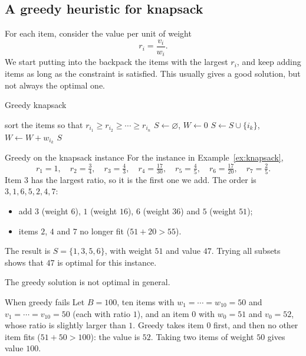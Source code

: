 \documentclass[a4paper,12pt,oneside]{report}
\begin{document}
\subsection{A greedy heuristic for knapsack}

For each item, consider the value per unit of weight
\[
  r_i=\frac{v_i}{w_i}.
\]
We start putting into the backpack the items with the largest $r_i$,
and keep adding items as long as the constraint is satisfied. This
usually gives a good solution, but not always the optimal one.

\begin{framedalgo}{Greedy knapsack}\label{alg:greedy-knapsack}
\begin{algorithmic}[1]
  \State sort the items so that $r_{i_1}\geq r_{i_2}\geq\cdots\geq r_{i_n}$
  \State $S\gets\varnothing$, $W\gets0$
      \State $S\gets S\cup\{i_k\}$, $W\gets W+w_{i_k}$
    \EndIf
  \EndFor
  \State \Return $S$
\end{algorithmic}
\end{framedalgo}

\begin{framedexample}{Greedy on the knapsack instance}
\label{ex:greedy-knapsack}
For the instance in Example~\ref{ex:knapsack},
\[
  r_1=1,\quad r_2=\tfrac34,\quad r_3=\tfrac43,\quad r_4=\tfrac{17}{30},
  \quad r_5=\tfrac45,\quad r_6=\tfrac{17}{20},\quad r_7=\tfrac25.
\]
Item $3$ has the largest ratio, so it is the first one we add. The
order is $3,1,6,5,2,4,7$:
\begin{itemize}
  \item add $3$ (weight $6$), $1$ (weight $16$), $6$ (weight $36$) and
    $5$ (weight $51$);
  \item items $2$, $4$ and $7$ no longer fit ($51+20>55$).
\end{itemize}
The result is $S=\{1,3,5,6\}$, with weight $51$ and value $47$. Trying
all subsets shows that $47$ is optimal for this instance.
\end{framedexample}

The greedy solution is not optimal in general.

\begin{framedexample}{When greedy fails}\label{ex:greedy-fails}
Let $B=100$, ten items with $w_1=\cdots=w_{10}=50$ and
$v_1=\cdots=v_{10}=50$ (each with ratio $1$), and an item $0$ with
$w_0=51$ and $v_0=52$, whose ratio is slightly larger than $1$.
Greedy takes item $0$ first, and then no other item fits
($51+50>100$): the value is $52$. Taking two items of weight $50$
gives value $100$.
\end{framedexample}
\end{document}
